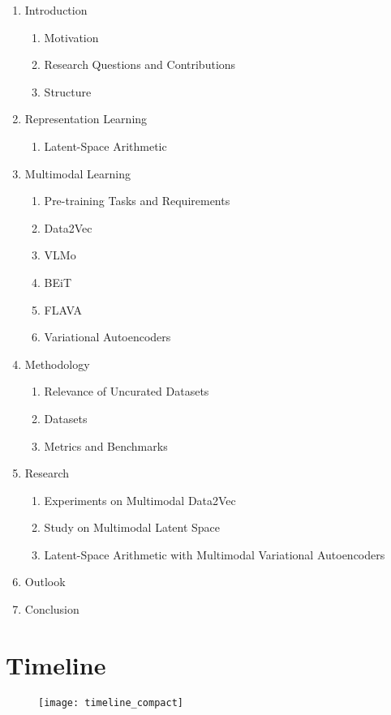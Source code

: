 \begin{enumerate}
    \item Introduction
        \begin{enumerate}
            \item Motivation
            \item Research Questions and Contributions
            \item Structure
        \end{enumerate}
    \item Representation Learning
        \begin{enumerate}
            \item Latent-Space Arithmetic
        \end{enumerate}
    \item Multimodal Learning
        \begin{enumerate}
            \item Pre-training Tasks and Requirements
            \item Data2Vec
            \item VLMo
            \item BEiT
            \item FLAVA
            \item Variational Autoencoders
        \end{enumerate}
    \item Methodology
        \begin{enumerate}
            \item Relevance of Uncurated Datasets
            \item Datasets
            \item Metrics and Benchmarks
        \end{enumerate}
    \item Research
        \begin{enumerate}
            \item Experiments on Multimodal Data2Vec
            \item Study on Multimodal Latent Space
            \item Latent-Space Arithmetic with Multimodal Variational Autoencoders
        \end{enumerate}
    \item Outlook
    \item Conclusion
\end{enumerate}

\chapter{Timeline}

\begin{figure}[htbp]
	\texttt{[image: timeline\_compact]}
	\centering
    \label{timeline_compact}
\end{figure}